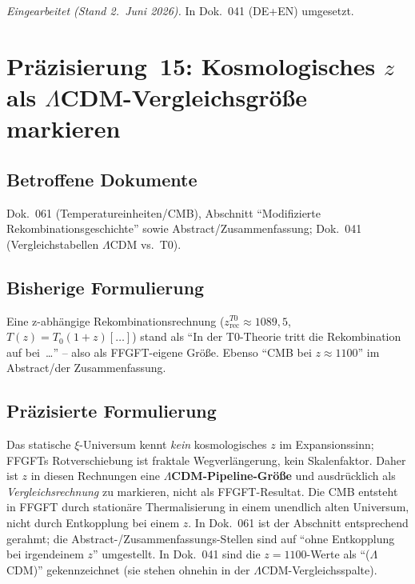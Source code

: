 \emph{Eingearbeitet (Stand 2.~Juni 2026).} In Dok.~041 (DE+EN) umgesetzt.

\section{\texorpdfstring{Präzisierung~15: Kosmologisches $z$ als $\Lambda$CDM-Vergleichsgröße markieren}{Praezisierung 15: Kosmologisches z als LambdaCDM-Vergleichsgroesse markieren}}

\subsection*{Betroffene Dokumente}

Dok.~061 (Temperatureinheiten/CMB), Abschnitt \enquote{Modifizierte
Rekombinationsgeschichte} sowie Abstract/Zusammenfassung; Dok.~041
(Vergleichstabellen $\Lambda$CDM vs.\ T0).

\subsection*{Bisherige Formulierung}

Eine z-abhängige Rekombinationsrechnung ($z_{\text{rec}}^{T0}\approx 1089{,}5$,
$T(z)=T_0(1+z)[\dots]$) stand als \enquote{In der T0-Theorie tritt die
Rekombination auf bei~\dots} -- also als FFGFT-eigene Größe. Ebenso
\enquote{CMB bei $z\approx 1100$} im Abstract/der Zusammenfassung.

\subsection*{Präzisierte Formulierung}

Das statische $\xi$-Universum kennt \emph{kein} kosmologisches $z$ im
Expansionssinn; FFGFTs Rotverschiebung ist fraktale Wegverlängerung, kein
Skalenfaktor. Daher ist $z$ in diesen Rechnungen eine
\textbf{$\Lambda$CDM-Pipeline-Größe} und ausdrücklich als
\emph{Vergleichsrechnung} zu markieren, nicht als FFGFT-Resultat. Die CMB
entsteht in FFGFT durch stationäre Thermalisierung in einem unendlich alten
Universum, nicht durch Entkopplung bei einem $z$. In Dok.~061 ist der
Abschnitt entsprechend gerahmt; die Abstract-/Zusammenfassungs-Stellen sind
auf \enquote{ohne Entkopplung bei irgendeinem $z$} umgestellt. In Dok.~041
sind die $z=1100$-Werte als \enquote{($\Lambda$CDM)} gekennzeichnet (sie
stehen ohnehin in der $\Lambda$CDM-Vergleichsspalte).

